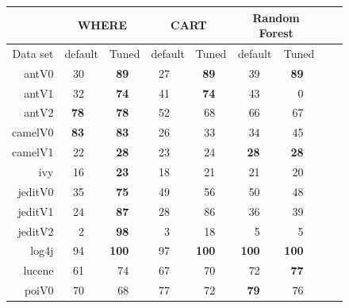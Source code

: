 \documentclass{sig-alternative}
\newcommand{\rone}{}
\newcommand{\rtwo}{}
\newcommand{\rthree}{}
\newcommand{\rfour}{}
\def\baselinestretch{1}
\begin{document}
\begin{figure}[!h]
\renewcommand{\baselinestretch}{0.8} 

\scriptsize    

\begin{tabular}{r|rl|rl|rl|rl|rl|rlrl}
      &   \multicolumn{4}{c|}{WHERE}         &   \multicolumn{4}{c|}{CART}         &   \multicolumn{4}{c}{Random Forest}         \\\hline
  Data set   &   \multicolumn{2}{c}{default}         &   \multicolumn{2}{c|}{Tuned}         &   \multicolumn{2}{c}{default}         &   \multicolumn{2}{c|}{Tuned}    &   \multicolumn{2}{c}{default}  &   \multicolumn{2}{c}{Tuned}\\\hline
antV0 & 30 &         & {\bf 89} & {\rfour} & 27 &         & {\bf 89} & {\rfour} & 39 &         & {\bf 89 }& {\rfour}\\
antV1 & 32 & {\rtwo} & {\bf 74} & {\rfour} & 41 & {\rtwo} & {\bf 74 }& {\rfour} & 43 & {\rtwo} & 0 &        \\
antV2 & {\bf 78} & {\rfour} & {\bf 78} & {\rfour} & 52 &         & 68 & {\rthree} & 66 & {\rtwo} & 67 & {\rtwo}\\
camelV0 & {\bf 83} & {\rfour} & {\bf 83} & {\rfour} & 26 &         & 33 &         & 34 &         & 45 & {\rone}\\
camelV1 & 22 &         & {\bf 28} & {\rfour} & 23 &         & 24 & {\rone} & {\bf 28} & {\rfour} & {\bf 28} & {\rfour}\\
ivy & 16 &         & {\bf 23} & {\rfour} & 18 & {\rone} & 21 & {\rthree} & 21 & {\rthree} & 20 & {\rtwo}\\
jeditV0 & 35 &         & {\bf 75} & {\rfour} & 49 & {\rone} & 56 & {\rtwo} & 50 & {\rone} & 48 & {\rone}\\
jeditV1 & 24 &         & {\bf 87} & {\rfour} & 28 &         & 86 & {\rfour} & 36 &         & 39 & {\rone}\\
jeditV2 & 2 &         & {\bf 98 }& {\rfour} & 3 &         & 18 &         & 5 &         & 5 &        \\
log4j & 94 &         & {\bf 100} & {\rfour} & 97 & {\rtwo} & {\bf 100} & {\rfour} & {\bf 100} & {\rfour} & {\bf 100 }& {\rfour}\\
lucene & 61 &         & 74 & {\rfour} & 67 & {\rone} & 70 & {\rtwo} & 72 & {\rthree} & {\bf 77} & {\rfour}\\
poiV0 & 70 &         & 68 &         & 77 & {\rfour} & 72 & {\rone} & {\bf 79} & {\rfour} & 76 & {\rthree}\\

\end{tabular}
\end{figure}
\end{document}
